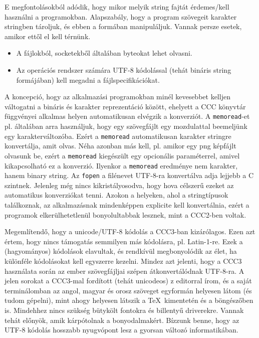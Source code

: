 E megfontolásokból adódik, hogy mikor melyik string 
fajtát érdemes/kell használni a programokban.
Alapszabály, hogy a program szövegeit karakter stringben
tároljuk, és ebben a formában manipuláljuk. 
Vannak persze esetek, amikor ettől el kell térnünk.
\begin{itemize}
\item 
    A fájlokból, socketekből általában byteokat lehet olvasni.
\item
    Az operációs rendszer számára UTF-8 kódolással 
    (tehát bináris string formájában) kell megadni a 
    fájlspecifikációkat.
\end{itemize}
A koncepció, hogy az alkalmazási programokban minél
kevesebbet kelljen váltogatni a bináris és karakter
reprezentáció között, ehelyett a CCC könyvtár függvényei
alkalmas helyen automatikusan elvégzik a konverziót.
A \verb!memoread!-et pl. általában arra használjuk,
hogy egy szövegfájlt egy mozdulattal beemeljünk  egy karakterváltozóba.
Ezért a \verb!memoread! automatikusan karakter stringre
konvertálja, amit olvas. Néha azonban más kell, pl. amikor
egy png képfájlt olvasunk be, ezért a \verb!memoread!
kiegészült egy opcionális paraméterrel, amivel kikapcsolható
ez a konverzió. Ilyenkor a \verb!memoread! eredménye nem 
karakter, hanem binary string.
Az \verb!fopen! a filénevet UTF-8-ra konvertálva adja 
lejjebb a C szintnek. Jelenleg még nincs kikristályosodva,
hogy hova célszerű ezeket az automatikus konverziókat tenni.
Azokon a helyeken, ahol a stringtípusok találkoznak,
az alkalmazásnak mindenképpen explicite kell konvertálnia, 
ezért a programok elkerülhetetlenül bonyolultabbak lesznek, 
mint a CCC2-ben voltak.

Megemlítendő, hogy a unicode/UTF-8 kódolás a CCC3-ban kizárólagos.
Ezen azt értem, hogy nincs támogatás semmilyen más kódolásra,
pl. Latin-1-re. Ezek a (hagyományos) kódolások elavultak,
és rendkívül megbonyolódik az élet, ha különféle kódolásokat
kell egyszerre kezelni. Mindez azt jelenti, hogy a CCC3 használata 
során az ember szövegfájljai szépen átkonvertálódnak UTF-8-ra.
A jelen sorokat a CCC3-mal fordított (tehát unicodeos) z editorral írom,
és a saját terminálomban az angol, magyar és orosz szöveget
egyformán helyesen látom (és tudom gépelni), mint ahogy helyesen
látszik a \TeX\  kimentetén és a böngészőben is. Mindehhez
nincs szükség bütykölt fontokra és billentyű driverekre.
Vannak tehát előnyök, amik kárpótolnak a bonyodalmakért. 
Bízzunk benne, hogy az UTF-8 kódolás hosszabb nyugvópont lesz 
a gyorsan változó informatikában.


